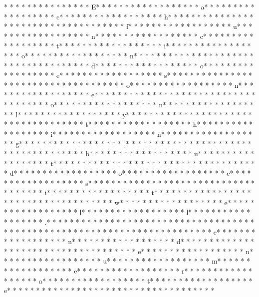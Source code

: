  * * *  * * *  *  * * *  *  * * *  * E* * *  * * *  * * *  *  * * *  *  * * *  * a* * *  * * *  * * *  *  * * *  *  * * *  * c* * *  * * *  * * *  *  * * *  *  * * *  * h* * *  * * *  * * *  *  * * *  *  * * *  *  * * *  * * *  * * *  *  * * *  *  * * *  * f* * *  * * *  * * *  *  * * *  *  * * *  * u* * *  * * *  * * *  *  * * *  *  * * *  * n* * *  * * *  * * *  *  * * *  *  * * *  * c* * *  * * *  * * *  *  * * *  *  * * *  * t* * *  * * *  * * *  *  * * *  *  * * *  * i* * *  * * *  * * *  *  * * *  *  * * *  * o* * *  * * *  * * *  *  * * *  *  * * *  * n* * *  * * *  * * *  *  * * *  *  * * *  *  * * *  * * *  * * *  *  * * *  *  * * *  * d* * *  * * *  * * *  *  * * *  *  * * *  * o* * *  * * *  * * *  *  * * *  *  * * *  * e* * *  * * *  * * *  *  * * *  *  * * *  * s* * *  * * *  * * *  *  * * *  *  * * *  *  * * *  * * *  * * *  *  * * *  *  * * *  * o* * *  * * *  * * *  *  * * *  *  * * *  * n* * *  * * *  * * *  *  * * *  *  * * *  * e* * *  * * *  * * *  *  * * *  *  * * *  *  * * *  * * *  * * *  *  * * *  *  * * *  * o* * *  * * *  * * *  *  * * *  *  * * *  * n* * *  * * *  * * *  *  * * *  *  * * *  * l* * *  * * *  * * *  *  * * *  *  * * *  * y* * *  * * *  * * *  *  * * *  *  * * *  *  * * *  * * *  * * *  *  * * *  *  * * *  * t* * *  * * *  * * *  *  * * *  *  * * *  * h* * *  * * *  * * *  *  * * *  *  * * *  * i* * *  * * *  * * *  *  * * *  *  * * *  * n* * *  * * *  * * *  *  * * *  *  * * *  * g* * *  * * *  * * *  *  * * *  *  * * *  * ,* * *  * * *  * * *  *  * * *  *  * * *  *  * * *  * * *  * * *  *  * * *  *  * * *  * b* * *  * * *  * * *  *  * * *  *  * * *  * u* * *  * * *  * * *  *  * * *  *  * * *  * t* * *  * * *  * * *  *  * * *  *  * * *  *  * * *  * * *  * * *  *  * * *  *  * * *  * d* * *  * * *  * * *  *  * * *  *  * * *  * o* * *  * * *  * * *  *  * * *  *  * * *  * e* * *  * * *  * * *  *  * * *  *  * * *  * s* * *  * * *  * * *  *  * * *  *  * * *  *  * * *  * * *  * * *  *  * * *  *  * * *  * i* * *  * * *  * * *  *  * * *  *  * * *  * t* * *  * * *  * * *  *  * * *  *  * * *  *  * * *  * * *  * * *  *  * * *  *  * * *  * w* * *  * * *  * * *  *  * * *  *  * * *  * e* * *  * * *  * * *  *  * * *  *  * * *  * l* * *  * * *  * * *  *  * * *  *  * * *  * l* * *  * * *  * * *  *  * * *  *  * * *  * .* * *  * * *  * * *  *  * * *  *  * * *  * 
* * *  * * *  * * *  *  * * *  *  * * *  * 	* * *  * * *  * * *  *  * * *  *  * * *  * 	* * *  * * *  * * *  *  * * *  *  * * *  * e* * *  * * *  * * *  *  * * *  *  * * *  * n* * *  * * *  * * *  *  * * *  *  * * *  * d* * *  * * *  * * *  *  * * *  *  * * *  * {* * *  * * *  * * *  *  * * *  *  * * *  * e* * *  * * *  * * *  *  * * *  *  * * *  * n* * *  * * *  * * *  *  * * *  *  * * *  * u* * *  * * *  * * *  *  * * *  *  * * *  * m* * *  * * *  * * *  *  * * *  *  * * *  * e* * *  * * *  * * *  *  * * *  *  * * *  * r* * *  * * *  * * *  *  * * *  *  * * *  * a* * *  * * *  * * *  *  * * *  *  * * *  * t* * *  * * *  * * *  *  * * *  *  * * *  * e* * *  * * *  * * *  *  * * *  *  * * *  * }* * *  * * *  * * *  *  * * *  *  * * *  * 
